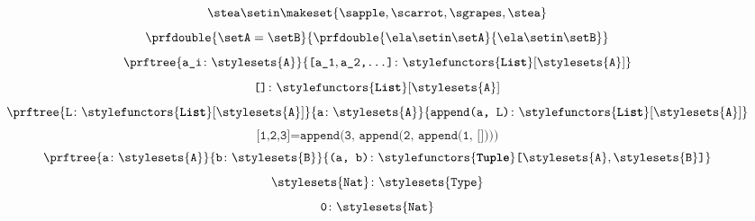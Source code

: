 {\begin{forslides}
        \begin{equation}
            \label{eq:2_session1_22}
            \stea \setin \makeset{\sapple,\scarrot,\sgrapes,\stea}
        \end{equation}
        \begin{equation}
            \label{eq:3_session1_22}
            \prfdouble{
                \setA =\setB}{\prfdouble{\ela \setin \setA}{\ela\setin \setB}}
        \end{equation}
        \begin{equation}
            \label{eq:typecon_1_session1_22}
            \prftree{\texttt{a\_i}\colon \stylesets{\texttt{A}}}{\texttt{[a\_1},\texttt{a\_2,\ldots]}\colon \stylefunctors{\textbf{\texttt{List}}}[\stylesets{\texttt{A}}]}
        \end{equation}
        \begin{equation}
            \label{eq:typecon_2_session1_22}
            \texttt{[]}\colon \stylefunctors{\textbf{\texttt{List}}}[\stylesets{\texttt{A}}]
        \end{equation}
        \begin{equation}
            \label{eq:typecon_3_session1_22}
            \prftree{\texttt{L}\colon \stylefunctors{\textbf{\texttt{List}}}[\stylesets{\texttt{A}}]}{\texttt{a}\colon \stylesets{\texttt{A}}}{\texttt{append(a, L)}\colon \stylefunctors{\textbf{\texttt{List}}}[\stylesets{\texttt{A}}]}
        \end{equation}
        \begin{equation}
            \label{eq:typecon_4_session1_22}
            \texttt{[1,2,3]} = \texttt{append(3, append(2, append(1, [])))}
        \end{equation}
        \begin{equation}
            \label{eq:typecon_5_session1_22}
            \prftree{\texttt{a}\colon \stylesets{\texttt{A}}}
            {\texttt{b}\colon \stylesets{\texttt{B}}}
            {\texttt{(a, b)}\colon \stylefunctors{\textbf{\texttt{Tuple}}}\texttt{[}\stylesets{\texttt{A}},\stylesets{\texttt{B}}\texttt{]}}
        \end{equation}
        \begin{equation}
            \label{eq:typecon_6_session1_22}
            \stylesets{\texttt{Nat}}\colon \stylesets{\texttt{Type}}
        \end{equation}
        \begin{equation}
            \label{eq:typecon_7_session1_22}
            \texttt{0}\colon \stylesets{\texttt{Nat}}

\end{equation}
\end{forslides}}
